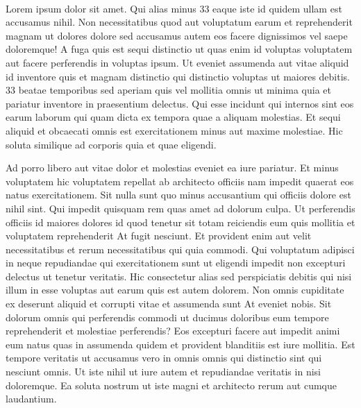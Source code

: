 \documentclass[a4paper,12pt]{report}
\begin{document}
\paragraph{}
Lorem ipsum dolor sit amet. Qui alias minus 33 eaque iste id quidem ullam est accusamus nihil. Non necessitatibus quod aut voluptatum earum et reprehenderit magnam ut dolores dolore sed accusamus autem eos facere dignissimos vel saepe doloremque! A fuga quis est sequi distinctio ut quas enim id voluptas voluptatem aut facere perferendis in voluptas ipsum. Ut eveniet assumenda aut vitae aliquid id inventore quis et magnam distinctio qui distinctio voluptas ut maiores debitis. 33 beatae temporibus sed aperiam quis vel mollitia omnis ut minima quia et pariatur inventore in praesentium delectus. Qui esse incidunt qui internos sint eos earum laborum qui quam dicta ex tempora quae a aliquam molestias. Et sequi aliquid et obcaecati omnis est exercitationem minus aut maxime molestiae. Hic soluta similique ad corporis quia et quae eligendi. 
\par Ad porro libero aut vitae dolor et molestias eveniet ea iure pariatur. Et minus voluptatem hic voluptatem repellat ab architecto officiis nam impedit quaerat eos natus exercitationem. Sit nulla sunt quo minus accusantium qui officiis dolore est nihil sint. Qui impedit quisquam rem quas amet ad dolorum culpa. Ut perferendis officiis id maiores dolores id quod tenetur sit totam reiciendis eum quis mollitia et voluptatem reprehenderit At fugit nesciunt. Et provident enim aut velit necessitatibus et rerum necessitatibus qui quia commodi. Qui voluptatum adipisci in neque repudiandae qui exercitationem sunt ut eligendi impedit non excepturi delectus ut tenetur veritatis. Hic consectetur alias sed perspiciatis debitis qui nisi illum in esse voluptas aut earum quis est autem dolorem. Non omnis cupiditate ex deserunt aliquid et corrupti vitae et assumenda sunt At eveniet nobis. Sit dolorum omnis qui perferendis commodi ut ducimus doloribus eum tempore reprehenderit et molestiae perferendis? Eos excepturi facere aut impedit animi eum natus quas in assumenda quidem et provident blanditiis est iure mollitia. Est tempore veritatis ut accusamus vero in omnis omnis qui distinctio sint qui nesciunt omnis. Ut iste nihil ut iure autem et repudiandae veritatis in nisi doloremque. Ea soluta nostrum ut iste magni et architecto rerum aut cumque laudantium. 
\end{document}
